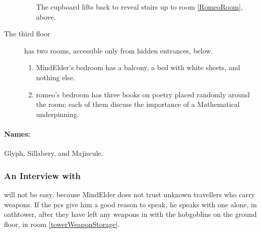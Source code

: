 \begin{multicols}{2}
\begin{description}
\begin{enumerate}
    The cupboard lifts back to reveal stairs up to room \ref{RomeoRoom}, above.
  \end{enumerate}
  \item[The third floor]
  has two rooms, accessible only from hidden entrances, below.
  \begin{enumerate}
    \item
    \Gls{MindElder}'s bedroom has a balcony, a bed with white sheets, and nothing else.\label{MindElderRoom}
    \item
    \Gls{romeo}'s bedroom has three books on poetry placed randomly around the room; each of them discuss the importance of a Mathematical underpinning.\label{RomeoRoom}
  \end{enumerate}
\end{description}


\paragraph{Names:}
Glyph, Sillabery, and Majiscule.


\subsubsection{An Interview with }
will not be easy, because \Gls{MindElder} does not trust unknown travellers who carry weapons.
If the \glspl{pc} give him a good reason to speak, he speaks with one alone, in \gls{oathtower}, after they have left any weapons in with the hobgoblins on the ground floor, in room \vref{towerWeaponStorage}.


\end{multicols}
